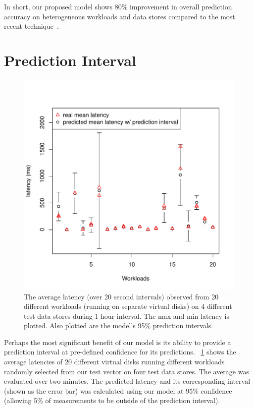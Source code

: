 In short, our proposed model shows 80\% improvement in overall prediction accuracy on heterogeneous workloads and data stores compared to the most recent technique~\cite{gulati:2011}.

\section{Prediction Interval}
\begin{figure}
\centering
\includegraphics[width=0.6\columnwidth, clip, trim=0 0.2in 0 0.7in]{figure/prediction_interval2.pdf}
\caption{The average latency (over 20 second intervals) observed from
  20 different workloads (running on separate virtual disks) on 4
  different test data stores during 1 hour interval.  The max and min
  latency is plotted. Also plotted are the model's 95\% prediction
  intervals.}
\label{predInterval}
\end{figure}

Perhaps the most significant benefit of our model is its ability to provide a prediction interval at pre-defined confidence for its predictions.
\figurename~\ref{predInterval} shows the average latencies of 20 different virtual disks running different workloads randomly selected from our test vector on four test data stores.
The average was evaluated over two minutes.
The predicted latency and its corresponding interval (shown as the error bar)  was calculated using our model at 95\% confidence (allowing 5\% of measurements to be outside of the prediction interval).

